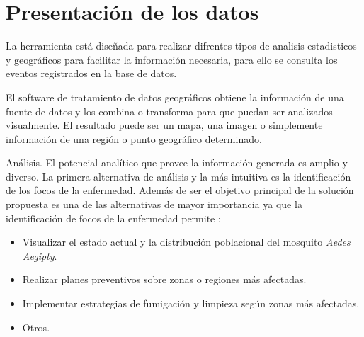 \section{Presentación de los datos}
La herramienta está diseñada para realizar difrentes tipos de analisis estadisticos y geográficos
para facilitar la información necesaria, para ello se consulta los eventos registrados en la base
de datos.

El software de tratamiento de datos geográficos obtiene la información de una fuente
de datos y los combina o transforma para que puedan ser analizados visualmente. El
resultado puede ser un mapa, una imagen o simplemente información de una región o
punto geográfico determinado.

Análisis. El potencial analítico que provee la información generada es amplio y diverso. La
primera alternativa de análisis y la más intuitiva es la identificación de los focos de la
enfermedad. Además de ser el objetivo principal de la solución propuesta es una de las
alternativas de mayor importancia ya que la identificación de focos de la enfermedad permite :
    \begin{itemize}
        \item Visualizar el estado actual y la distribución poblacional del mosquito \textit{Aedes Aegipty}.
        \item Realizar planes preventivos sobre zonas o regiones más afectadas.
        \item Implementar estrategias de fumigación y limpieza según zonas más afectadas.
        \item Otros.
    \end{itemize}

